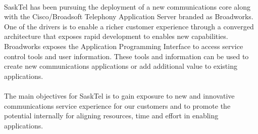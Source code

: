 \documentclass[12pt]{article}
\begin{document}
\paragraph{} 
	SaskTel has been pursuing the deployment of a new communications core along with the Cisco/Broadsoft Telephony Application Server branded as Broadworks.  One of the drivers is to enable a richer customer experience through a converged architecture that exposes rapid development to enables new capabilities.  Broadworks exposes the Application Programming Interface to access service control tools and user information.  These tools and information can be used to create new communications applications or add additional value to existing applications.  
\paragraph{} 
	The main objectives for SaskTel is to gain exposure to new and innovative communications service experience for our customers and to promote the potential internally for aligning resources, time and effort in enabling applications.
\end{document}
